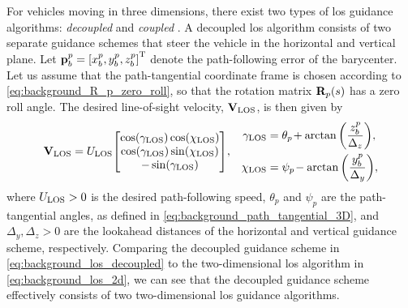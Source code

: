 For vehicles moving in three dimensions, there exist two types of \gls{los} guidance algorithms: \emph{decoupled} \cite{caharija_path_2012,abdurahman_switching_2019} and \emph{coupled} \cite{breivik_principles_2005,yu_nonlinear_2017,yu_LOS_2020}.
A decoupled \gls{los} algorithm consists of two separate guidance schemes that steer the vehicle in the horizontal and vertical plane.
Let $\mathbf{p}_b^p = \left[x_b^p, y_b^p, z_b^p\right]^{\mathrm{T}}$ denote the path-following error of the barycenter.
Let us assume that the path-tangential coordinate frame is chosen according to \eqref{eq:background_R_p_zero_roll}, so that the rotation matrix $\mathbf{R}_p(s)$ has a zero roll angle.
The desired line-of-sight velocity, $\mathbf{V}_{\rm LOS}$, is then given by
\begin{align}
    \mathbf{V}_{\rm LOS} &= U_{\rm LOS} \!
    \begin{bmatrix}
        \cos(\gamma_{\rm LOS}) \cos(\chi_{\rm LOS}) \\
        \cos(\gamma_{\rm LOS}) \sin(\chi_{\rm LOS}) \\
        -\sin(\gamma_{\rm LOS})
    \end{bmatrix}\!, &
    \begin{split}
        \gamma_{\rm LOS} &= \theta_{p\!} + \arctan\left(\frac{z_b^p}{\Delta_z}\right)\!, \\
        \chi_{\rm LOS} &= \psi_{p\!} - \arctan\left(\frac{y_b^p}{\Delta_y}\right)\!, \\
    \end{split}
    \label{eq:background_los_decoupled}
\end{align}
where $U_{\rm LOS} > 0$ is the desired path-following speed, $\theta_p$ and $\psi_p$ are the path-tangential angles, as defined in \eqref{eq:background_path_tangential_3D}, and $\Delta_y, \Delta_z > 0$ are the lookahead distances of the horizontal and vertical guidance scheme, respectively.
Comparing the decoupled guidance scheme in \eqref{eq:background_los_decoupled} to the two-dimensional \gls{los} algorithm in \eqref{eq:background_los_2d}, we can see that the decoupled guidance scheme effectively consists of two two-dimensional \gls{los} guidance algorithms.

